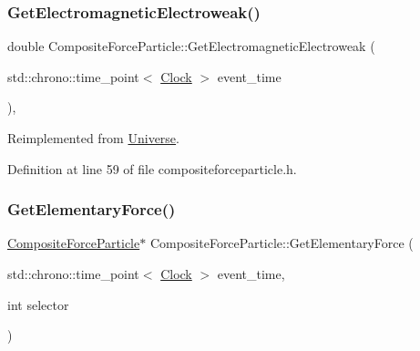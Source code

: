 \subsubsection{\texorpdfstring{Get\+Electromagnetic\+Electroweak()}{GetElectromagneticElectroweak()}}
{\footnotesize\ttfamily double Composite\+Force\+Particle\+::\+Get\+Electromagnetic\+Electroweak (\begin{DoxyParamCaption}\item[{std\+::chrono\+::time\+\_\+point$<$ \hyperlink{universe_8h_a0ef8d951d1ca5ab3cfaf7ab4c7a6fd80}{Clock} $>$}]{event\+\_\+time }\end{DoxyParamCaption})\hspace{0.3cm}{\ttfamily [inline]}, {\ttfamily [virtual]}}



Reimplemented from \hyperlink{class_universe_a9f099605c082e7fa755787a6a8cab7ba}{Universe}.



Definition at line 59 of file compositeforceparticle.\+h.

\mbox{\label{class_composite_force_particle_a63b3daf44517c90bb805b6612dd26acc}} 
\subsubsection{\texorpdfstring{Get\+Elementary\+Force()}{GetElementaryForce()}}
{\footnotesize\ttfamily \hyperlink{class_composite_force_particle}{Composite\+Force\+Particle}$\ast$ Composite\+Force\+Particle\+::\+Get\+Elementary\+Force (\begin{DoxyParamCaption}\item[{std\+::chrono\+::time\+\_\+point$<$ \hyperlink{universe_8h_a0ef8d951d1ca5ab3cfaf7ab4c7a6fd80}{Clock} $>$}]{event\+\_\+time,  }\item[{int}]{selector }\end{DoxyParamCaption})}


